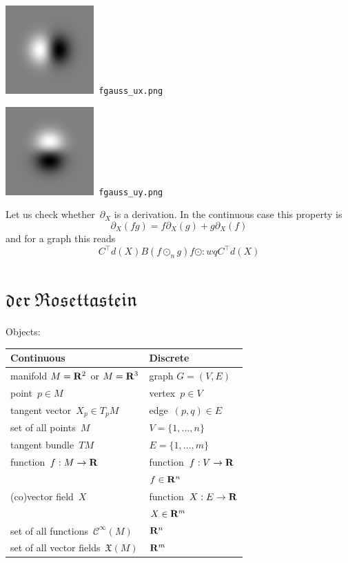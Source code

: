 \includegraphics{fgauss_ux.png}\verb+ fgauss_ux.png+

\includegraphics{fgauss_uy.png}\verb+ fgauss_uy.png+


Let us check whether~$\partial_X$ is a derivation.  In the continuous case
this property is
\[
	\partial_X\left(fg\right)
	=
	f\partial_X\left(g\right)
	+
	g\partial_X\left(f\right)
\]
and for a graph this reads
\[
	C^\top d(X)B\left(f\odot_n g\right)
	f\odot :wqC^\top d(X)
\]

\clearpage

\section*{$\mathfrak{der\ Rosettastein}$}

\renewcommand\arraystretch{1.4} %
\thispagestyle{empty}

Objects:\newline
\begin{tabular}{|l|l|}
	\hline
	{\bf Continuous} & {\bf Discrete} \\
	\hline
	manifold $M=\mathbf{R}^2$ or $M=\mathbf{R}^3$ & graph $G=(V,E)$ \\
	\hline
	point~$p\in M$ & vertex~$p\in V$ \\
	\hline
	tangent vector~$X_p\in T_pM$ & edge~$(p,q)\in E$ \\
	\hline
	set of all points~$M$ & $V=\{1,\ldots,n\}$ \\
	\hline
	tangent bundle~$TM$ & $E=\{1,\ldots,m\}$ \\
	\hline
	function~$f:M\to\mathbf{R}$ & function~$f:V\to\mathbf{R}$ \\
	& $f\in\mathbf{R}^n$ \\
	\hline
	(co)vector field~$X$ & function~$X:E\to\mathbf{R}$ \\
	& $X\in\mathbf{R}^m$ \\
	\hline
	set of all functions~$\mathcal{C}^\infty(M)$ & $\mathbf{R}^n$ \\
	\hline
	set of all vector fields~$\mathfrak{X}(M)$ & $\mathbf{R}^m$ \\
	\hline
\end{tabular}

